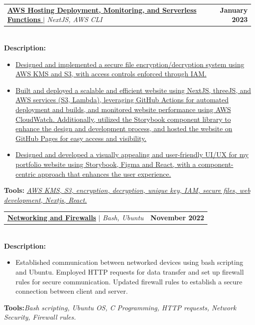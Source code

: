 \documentclass[letterpaper,11pt]{article}
\makeatletter
\newcommand{\resumeItem}[1]{
  \item\small{
    {#1 \vspace{-2pt}}
  }
}
\newcommand{\resumeProjectHeading}[2]{
    \item
    \begin{tabular*}{1.001\textwidth}{l@{\extracolsep{\fill}}r}
      \small#1 & \textbf{\small #2}\\
    \end{tabular*}\vspace{-7pt}
}
\newcommand{\resumeItemListStart}{\begin{itemize}}
\newcommand{\resumeItemListEnd}{\end{itemize}\vspace{-5pt}}
\makeatother
\begin{document}
          \resumeProjectHeading
          {\href{https://yakkshit.com}{\textbf{AWS Hosting Deployment, Monitoring, and Serverless Functions }} $|$ \emph{NextJS, AWS CLI} \faGithub}{January 2023}\\
          \vspace{6pt}
          \textbf{Description:} 
          \vspace{-5pt}
          \resumeItemListStart
            \resumeItem{\href{https://yakkshit.com}{Designed and implemented a secure file encryption/decryption system using AWS KMS and S3, with access controls enforced through IAM.}}
            \resumeItem{\href{https://yakkshit.com}{Built and deployed a scalable and efficient website using NextJS, threeJS, and AWS services (S3, Lambda), leveraging GitHub Actions for automated deployment and builds, and monitored website performance using AWS CloudWatch. Additionally, utilized the Storybook component library to enhance the design and development process, and hosted the website on GitHub Pages for easy access and visibility.}}
            \resumeItem{\href{https://yakkshit.com}{Designed and developed a visually appealing and user-friendly UI/UX for my portfolio website using Storybook, Figma and React, with a component-centric approach that enhances the user experience.}}
          \resumeItemListEnd
          \vspace{-2pt}
          \textbf{Tools:}\emph{ \href{https://yakkshit.com}{AWS KMS, S3, encryption, decryption, unique key, IAM, secure files, web development, Nextjs, React.}}

          \vspace{-18pt}




                

\resumeProjectHeading
          {\textbf{\href{https://github.com/saiyakkshit?tab=repositories}{Networking and Firewalls}} $|$ \emph{Bash, Ubuntu \faGithub}}{November 2022}\\
          \vspace{6pt}
          \textbf{Description:}
           \vspace{-5pt}
          \resumeItemListStart
          \resumeItem{Established communication between networked devices using bash scripting and Ubuntu. Employed HTTP requests for data transfer and set up firewall rules for secure communication. Updated firewall rules to establish a secure connection between client and server.}
          \resumeItemListEnd 
          \textbf{Tools:}\emph{Bash scripting,
Ubuntu OS,
C Programming,
HTTP requests, Network Security,
Firewall rules.}
\vspace{-18pt}
\end{document}
